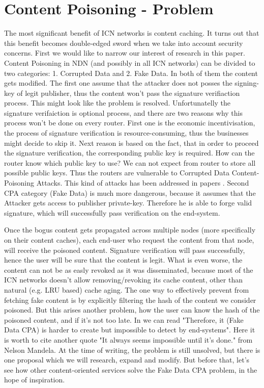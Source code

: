 \documentclass[nostrict]{szablonPG}
\begin{document}
\section{Content Poisoning - Problem}
The most significant benefit of ICN networks is content caching. It turns out that this benefit becomes double-edged sword when we take into account security concerns. 
First we would like to narrow our interest of research in this paper. Content Poisoning in NDN (and possibly in all ICN networks) can be divided to two categories: 1. Corrupted Data and 2. Fake Data. In both of them the content gets modified. The first one assume that the attacker does not posses the signing-key of legit publisher, thus the content won't pass the signature verifiaction process. This might look like the problem is resolved. Unfortunatelly the signature verifaiction is optional process, and there are two reasons why this process won't be done on every router. First one is the economic incentivisation, the process of signature verification is resource-consuming, thus the businesses might decide to skip it. Next reason is based on the fact, that in order to proceed the signature verification, the corresponding public key is required. How can the router know which public key to use? We can not expect from router to store all possible public keys. Thus the routers are vulnerable to Corrupted Data Content-Poisoning Attacks. This kind of attacks has been addressed in papers \cite{ghali2014needle} \cite{yu2018content} \cite{nguyen2017content}. Second CPA category (Fake Data) is much more dangerous, because it assumes that the Attacker gets access to publisher private-key. Therefore he is able to forge valid signature, which will successfully pass verification on the end-system. 

Once the bogus content gets propagated across multiple nodes (more specifically on their content caches), each end-user who request the content from that node, will receive the poisoned content. Signature verification will pass successfully, hence the user will be sure that the content is legit. What is even worse, the content can not be as easly revoked as it was disseminated, because most of the ICN networks doesn't allow removing/revoking its cache content, other than natural (e.g. LRU based) cache aging. The one way to effectively prevent from fetching fake content is by explicitly filtering the hash of the content we consider poisoned. But this arises another problem, how the user can know the hash of the poisoned content, and if it's not too late. In \cite{nguyen2017content} we can read "Therefore, it (Fake Data CPA) is harder to create but impossible to detect by end-systems". Here it is worth to cite another quote "It always seems impossible until it's done." from Nelson Mandela. At the time of writing, the problem is still unsolved, but there is one proposal \cite{konorski2019mitigating} which we will research, expand and modify. But before that, let's see how other content-oriented services solve the Fake Data CPA problem, in the hope of inspiration.
\end{document}
